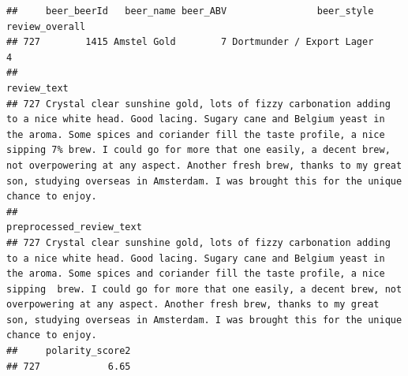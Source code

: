 \documentclass[
  a4paper,
]{article}
\newenvironment{Shaded}{\begin{snugshade}}{\end{snugshade}}
\newcommand{\NormalTok}[1]{#1}
\newcommand{\SpecialCharTok}[1]{\textcolor[rgb]{0.81,0.36,0.00}{\textbf{#1}}}
\newcommand{\StringTok}[1]{\textcolor[rgb]{0.31,0.60,0.02}{#1}}
\begin{document}
\begin{verbatim}
##     beer_beerId   beer_name beer_ABV                beer_style review_overall
## 727        1415 Amstel Gold        7 Dortmunder / Export Lager              4
##                                                                                                                                                                                                                                                                                                                                                                                                                                   review_text
## 727 Crystal clear sunshine gold, lots of fizzy carbonation adding to a nice white head. Good lacing. Sugary cane and Belgium yeast in the aroma. Some spices and coriander fill the taste profile, a nice sipping 7% brew. I could go for more that one easily, a decent brew, not overpowering at any aspect. Another fresh brew, thanks to my great son, studying overseas in Amsterdam. I was brought this for the unique chance to enjoy.
##                                                                                                                                                                                                                                                                                                                                                                                                                    preprocessed_review_text
## 727 Crystal clear sunshine gold, lots of fizzy carbonation adding to a nice white head. Good lacing. Sugary cane and Belgium yeast in the aroma. Some spices and coriander fill the taste profile, a nice sipping  brew. I could go for more that one easily, a decent brew, not overpowering at any aspect. Another fresh brew, thanks to my great son, studying overseas in Amsterdam. I was brought this for the unique chance to enjoy.
##     polarity_score2
## 727            6.65
\end{verbatim}

\begin{Shaded}
\end{Shaded}
\end{document}

